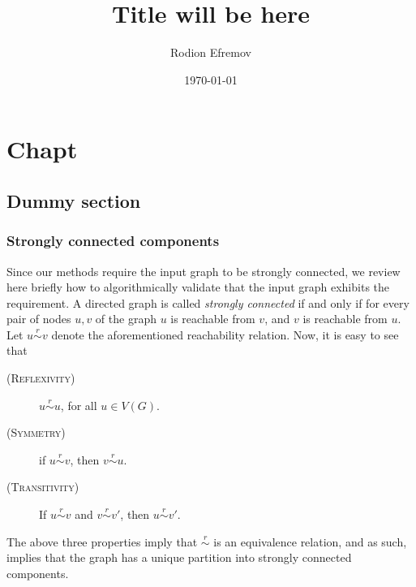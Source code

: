 \documentclass[english]{tktltiki2}
\title{Title will be here}
\author{Rodion Efremov}
\date{\today}
\theoremstyle{definition}
\theoremstyle{remark}
\begin{document}

\frontmatter      %

\maketitle        %
\makeabstract     %

\tableofcontents  %


\mainmatter       %

%
%
% 
%

\chapter{Chapt}
\section*{Dummy section}

\subsection{Strongly connected components}
Since our methods require the input graph to be strongly connected, we review here briefly how to algorithmically validate that the input graph exhibits the requirement. A directed graph is called \textit{strongly connected} if and only if for every pair of nodes $u, v$ of the graph $u$ is reachable from $v$, and $v$ is reachable from $u$. Let $u \overset{r}{\sim} v$ denote the aforementioned reachability relation. Now, it is easy to see that
\begin{description}
\item[\textsc{(Reflexivity)}]  $u \overset{r}{\sim} u$, for all $u \in V(G)$.
\item[\textsc{(Symmetry)}] if  $u \overset{r}{\sim} v$, then $v \overset{r}{\sim} u$.
\item[\textsc{(Transitivity)}] If $u \overset{r}{\sim} v$ and $v \overset{r}{\sim} v'$, then $u \overset{r}{\sim} v'$.
\end{description}
The above three properties imply that $\overset{r}{\sim}$ is an equivalence relation, and as such, implies that the graph has a unique partition into strongly connected components.
\end{document}
